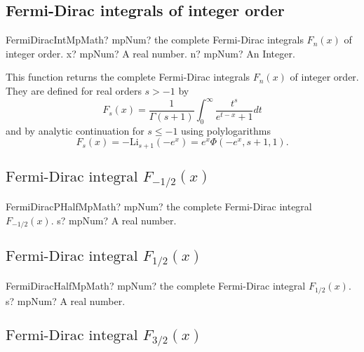 \subsection{Fermi-Dirac integrals of integer order}

\begin{mpFunctionsExtract}
	\mpFunctionTwoNotImplemented
	{FermiDiracIntMpMath? mpNum? the complete Fermi-Dirac integrals $F_n(x)$ of integer order.}
	{x? mpNum? A real number.}
	{n? mpNum? An Integer.}
\end{mpFunctionsExtract}

\vspace{0.3cm}
This function returns the complete Fermi-Dirac integrals $F_n(x)$ of integer order. They are defined for real orders $s>-1$ by
\begin{equation}
	F_s(x)=\frac{1}{\Gamma(s+1)} \int_0^\infty \frac{t^s}{e^{t-x}+1} dt
\end{equation}
and by analytic continuation for $s \leq -1$ using polylogarithms
\begin{equation}
	F_s(x)=-\text{Li}_{s+1}(-e^x) = e^x \Phi(-e^x,s+1,1).
\end{equation}




\subsection{\texorpdfstring{$\text{Fermi-Dirac integral }F_{-1/2}(x)$}{FermiDiracM1}}

\begin{mpFunctionsExtract}
	\mpFunctionOneNotImplemented
	{FermiDiracPHalfMpMath? mpNum? the complete Fermi-Dirac integral $F_{-1/2}(x)$.}
	{s? mpNum? A real number.}
\end{mpFunctionsExtract}




\subsection{\texorpdfstring{$\text{Fermi-Dirac integral }F_{1/2}(x)$}{FermiDiracP1}}

\begin{mpFunctionsExtract}
	\mpFunctionOneNotImplemented
	{FermiDiracHalfMpMath? mpNum? the complete Fermi-Dirac integral $F_{1/2}(x)$.}
	{s? mpNum? A real number.}
\end{mpFunctionsExtract}




\subsection{\texorpdfstring{$\text{Fermi-Dirac integral }F_{3/2}(x)$}{FermiDiracP1}}

